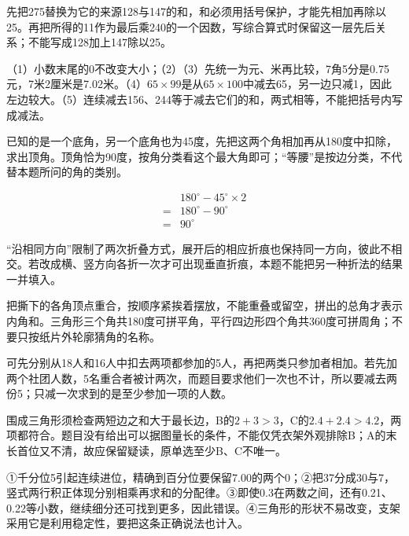 \documentclass[multi=snippet,border=0pt]{standalone}
\newenvironment{snippet}[3]{\begin{minipage}{#1bp}\color{answerred}\fontsize{#2}{#3}\selectfont\raggedright}{\end{minipage}}
\begin{document}
\begin{snippet}{505}{11.5}{14}先把275替换为它的来源128与147的和，和必须用括号保护，才能先相加再除以25。再把所得的11作为最后乘240的一个因数，写综合算式时保留这一层先后关系；不能写成128加上147除以25。\end{snippet}
\begin{snippet}{505}{11.5}{14}（1）小数末尾的0不改变大小；（2）（3）先统一为元、米再比较，7角5分是0.75元，7米2厘米是7.02米。（4）\(65\times99\)是从\(65\times100\)中减去65，另一边只减1，因此左边较大。（5）连续减去156、244等于减去它们的和，两式相等，不能把括号内写成减法。\end{snippet}
\begin{snippet}{505}{11.5}{14}已知的是一个底角，另一个底角也为45度，先把这两个角相加再从180度中扣除，求出顶角。顶角恰为90度，按角分类看这个最大角即可；“等腰”是按边分类，不代替本题所问的角的类别。\par \[\begin{aligned}&180^\circ-45^\circ\times2\\={}&180^\circ-90^\circ\\={}&90^\circ\end{aligned}\]\end{snippet}
\begin{snippet}{505}{11.5}{14}“沿相同方向”限制了两次折叠方式，展开后的相应折痕也保持同一方向，彼此不相交。若改成横、竖方向各折一次才可出现垂直折痕，本题不能把另一种折法的结果一并填入。\end{snippet}
\begin{snippet}{505}{11.5}{14}把撕下的各角顶点重合，按顺序紧挨着摆放，不能重叠或留空，拼出的总角才表示内角和。三角形三个角共180度可拼平角，平行四边形四个角共360度可拼周角；不要只按纸片外轮廓猜角的名称。\end{snippet}
\begin{snippet}{505}{11.5}{14}可先分别从18人和16人中扣去两项都参加的5人，再把两类只参加者相加。若先加两个社团人数，5名重合者被计两次，而题目要求他们一次也不计，所以要减去两份5；只减一次求到的是至少参加一项的人数。\end{snippet}
\begin{snippet}{505}{11.5}{14}围成三角形须检查两短边之和大于最长边，B的\(2+3>3\)，C的\(2.4+2.4>4.2\)，两项都符合。题目没有给出可以据图量长的条件，不能仅凭衣架外观排除B；A的末长首位又不清，故应保留疑读，原单选至少B、C不唯一。\end{snippet}
\begin{snippet}{505}{11.5}{14}①千分位5引起连续进位，精确到百分位要保留7.00的两个0；②把37分成30与7，竖式两行积正体现分别相乘再求和的分配律。③即使0.3在两数之间，还有0.21、0.22等小数，继续细分还可找到更多，因此错误。④三角形的形状不易改变，支架采用它是利用稳定性，要把这条正确说法也计入。\end{snippet}
\end{document}
